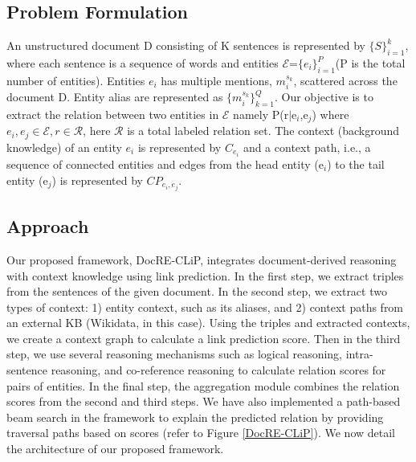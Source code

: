 \documentclass[letterpaper]{article} %
\begin{document}
\subsection{Problem Formulation}
An unstructured document D consisting of K sentences is represented by $\{S\}_{i=1}^{k}$, where each sentence is a sequence of words and entities $\mathcal{E}$=$\{{e_i}\}_{i=1}^{P}$(P is the total number of entities). Entities $e_{i}$  has multiple mentions, $m_{i}^{s_{k}}$, scattered across the document D. Entity alias are represented as $\{{m_{i}^{s_{k}}}\}_{k=1}^{Q}$. Our objective is to extract the relation between two entities in $\mathcal{E}$ namely P(r$\mid${e$_i$,e$_j$}) where $e_i,e_j\in \mathcal{E}, r\in \mathcal{R}$, here $\mathcal{R}$ is a total labeled relation set. The context (background knowledge) of an entity ${e_i}$ is represented by $C_{e_i}$ and a context path, i.e., a sequence of connected entities and edges from the head entity (e$_i$) to the tail entity (e$_j$) is represented by $CP_{e_i,e_j}$.

\subsection{Approach}
 Our proposed framework, DocRE-CLiP, integrates document-derived reasoning with context knowledge using link prediction. In the first step, we extract triples from the sentences of the given document. In the second step, we extract two types of context: 1) entity context, such as its aliases, and 2) context paths from an external KB  (Wikidata, in this case). Using the triples and extracted contexts, we create a context graph to calculate a link prediction score. Then in the third step, we use several reasoning mechanisms such as logical reasoning, intra-sentence reasoning, and co-reference reasoning to calculate relation scores for pairs of entities. In the final step,  
the aggregation module combines the relation scores from the second and third steps. We have also implemented a path-based beam search in the framework to explain the predicted relation by providing traversal paths based on scores (refer to Figure \ref{DocRE-CLiP}). We now detail the architecture of our proposed framework.
\end{document}
